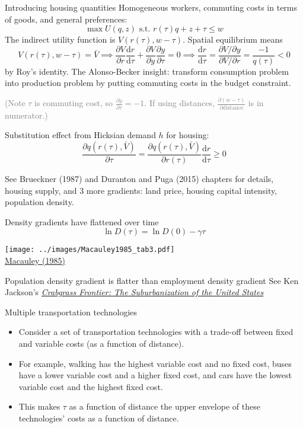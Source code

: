 \documentclass[11pt,notes=hide,aspectratio=169]{beamer}
\begin{document}
\begin{frame}{Introducing housing quantities}
Homogeneous workers, commuting costs in terms of goods, and general preferences:
$$
\max U(q,z) \text{ s.t. } r(\tau) q + z + \tau \leq w 
$$
The indirect utility function is $V(r(\tau),w - \tau)$.
Spatial equilibrium means
$$
V(r(\tau),w - \tau) = \bar{V}
\implies
\frac{\partial V}{\partial r}\frac{\textrm{d} r}{\textrm{d} \tau} 
+
\frac{\partial V}{\partial y}\frac{\partial y}{\partial \tau}
=
0
\implies
\frac{\textrm{d} r}{\textrm{d} \tau}
=
\frac{\partial V/\partial y}{\partial V/\partial r}
=
\frac{-1}{q(\tau)}
< 0
$$
by Roy's identity.
The Alonso-Becker insight: transform consumption problem into production problem by putting commuting costs in the budget constraint.
{\footnotesize 
\textcolor{gray}{(Note $\tau$ is commuting cost, so $\frac{\partial y}{\partial \tau} = -1$. If using distances, $\frac{\partial (w-\tau)}{\partial \text{distance}}$ is in numerator.)}
\par}
Substitution effect from Hicksian demand $h$ for housing:
$$
\frac{\partial q(r(\tau),\bar{V})}{\partial \tau}
=
\frac{\partial q(r(\tau),\bar{V})}{\partial r(\tau)}
\frac{\textrm{d} r}{\textrm{d} \tau}
\geq 0
$$
{\small 
See Brueckner (1987) and Duranton and Puga (2015) chapters for details,
housing supply, and 3 more gradients:
land price, housing capital intensity, population density.
\par}
\end{frame}
\begin{frame}{Density gradients have flattened over time}
\vspace{-4mm}
$$\ln D (\tau) = \ln D(0) - \gamma \tau$$
\begin{center}
\texttt{[image: ../images/Macauley1985\_tab3.pdf]}\\ \vspace{-2mm}
\href{https://doi.org/10.1016/0094-1190(85)90021-X}{Macauley (1985)}
\end{center}
Population density gradient is flatter than employment density gradient
See Ken Jackson's \href{https://en.wikipedia.org/wiki/Crabgrass_Frontier}{\textit{Crabgrass Frontier: The Suburbanization of the United States}}
\end{frame}
\begin{frame}{Multiple transportation technologies}
\begin{itemize}
\item Consider a set of transportation technologies with a trade-off between fixed and variable costs (as a function of distance).
\item For example, walking has the highest variable cost and no fixed cost,
buses have a lower variable cost and a higher fixed cost, and cars
have the lowest variable cost and the highest fixed cost.
\item This makes $\tau$ as a function of distance the upper envelope of these technologies' costs as a function of distance.
\end{itemize}
\end{frame}
\end{document}
